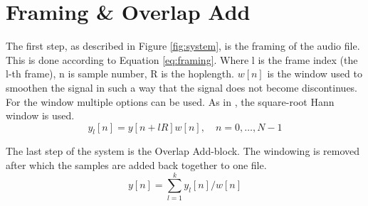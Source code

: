 \section{Framing \& Overlap Add} \label{sec:framing_overlap_add}

The first step, as described in Figure \ref{fig:system}, is the framing of the audio file. This is done according to Equation \ref{eq:framing}. Where l is the frame index (the l-th frame), n is sample number, R is the hoplength. $w[n]$ is the window used to smoothen the signal in such a way that the signal does not become discontinues. For the window multiple options can be used. As in \cite{}, the square-root Hann window is used.
\begin{equation}
  \label{eq:framing}
  y_{l}[n] = y[n + lR]w[n],\quad n=0,\hdots,N-1
\end{equation}

The last step of the system is the Overlap Add-block. The windowing is removed after which the samples are added back together to one file.
\begin{equation}
  \label{eq:overlap_add}
  y[n] =  \sum_{l=1}^{k} y_{l}[n]/w[n]
\end{equation}
